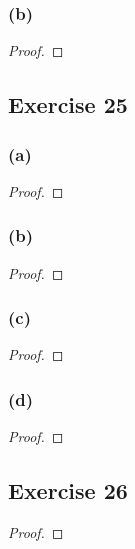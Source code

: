 \documentclass[14pt]{extarticle}
\begin{document}
\subsubsection{(b)}

\begin{proof}

\end{proof}

\subsection{Exercise 25}

\subsubsection{(a)}

\begin{proof}

\end{proof}

\subsubsection{(b)}

\begin{proof}

\end{proof}

\subsubsection{(c)}

\begin{proof}

\end{proof}

\subsubsection{(d)}

\begin{proof}

\end{proof}

\subsection{Exercise 26}

\begin{proof}

\end{proof}
\end{document}
